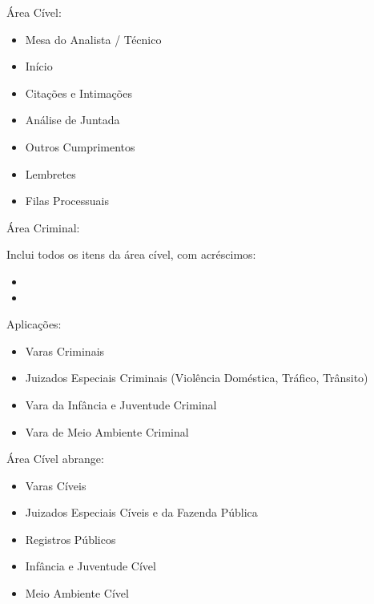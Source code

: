\documentclass[letterpaper,10pt,brazil]{sphinxmanual}
\begin{document}
\sphinxAtStartPar
Área Cível:
\begin{itemize}
\item {} 
\sphinxAtStartPar
Mesa do Analista / Técnico

\item {} 
\sphinxAtStartPar
Início

\item {} 
\sphinxAtStartPar
Citações e Intimações

\item {} 
\sphinxAtStartPar
Análise de Juntada

\item {} 
\sphinxAtStartPar
Outros Cumprimentos

\item {} 
\sphinxAtStartPar
Lembretes

\item {} 
\sphinxAtStartPar
Filas Processuais

\end{itemize}

\sphinxAtStartPar
Área Criminal:

\sphinxAtStartPar
Inclui todos os itens da área cível, com acréscimos:
\begin{itemize}
\item {} 
\sphinxAtStartPar
{}

\item {} 
\sphinxAtStartPar
{}

\end{itemize}

\sphinxAtStartPar
Aplicações:
\begin{itemize}
\item {} 
\sphinxAtStartPar
Varas Criminais

\item {} 
\sphinxAtStartPar
Juizados Especiais Criminais (Violência Doméstica, Tráfico, Trânsito)

\item {} 
\sphinxAtStartPar
Vara da Infância e Juventude Criminal

\item {} 
\sphinxAtStartPar
Vara de Meio Ambiente Criminal

\end{itemize}

\sphinxAtStartPar
Área Cível abrange:
\begin{itemize}
\item {} 
\sphinxAtStartPar
Varas Cíveis

\item {} 
\sphinxAtStartPar
Juizados Especiais Cíveis e da Fazenda Pública

\item {} 
\sphinxAtStartPar
Registros Públicos

\item {} 
\sphinxAtStartPar
Infância e Juventude Cível

\item {} 
\sphinxAtStartPar
Meio Ambiente Cível

\end{itemize}
\end{document}
